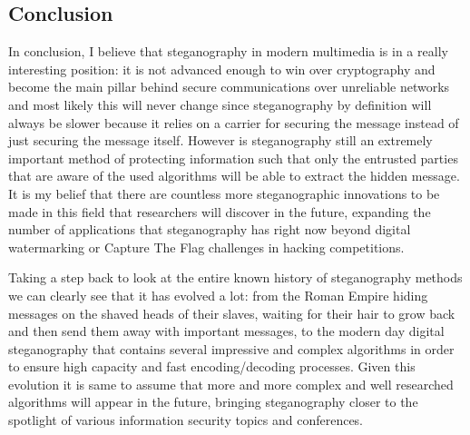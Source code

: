 \documentclass[notitlepage]{report}
\begin{document}
\begin{multicols*}{2}
\chapter{Conclusion}
In conclusion, I believe that steganography in modern multimedia is in a really interesting position: it is not advanced enough to win over cryptography and become the main pillar behind secure communications over unreliable networks and most likely this will never change since steganography by definition will always be slower because it relies on a carrier for securing the message instead of just securing the message itself. However is steganography still an extremely important method of protecting information such that only the entrusted parties that are aware of the used algorithms will be able to extract the hidden message. It is my belief that there are countless more steganographic innovations to be made in this field that researchers will discover in the future, expanding the number of applications that steganography has right now beyond digital watermarking or Capture The Flag challenges in hacking competitions. 

Taking a step back to look at the entire known history of steganography methods we can clearly see that it has evolved a lot: from the Roman Empire hiding messages on the shaved heads of their slaves, waiting for their hair to grow back and then send them away with important messages, to the modern day digital steganography that contains several impressive and complex algorithms in order to ensure high capacity and fast encoding/decoding processes. Given this evolution it is same to assume that more and more complex and well researched algorithms will appear in the future, bringing steganography closer to the spotlight of various information security topics and conferences.
\end{multicols*}


  

\end{document}
